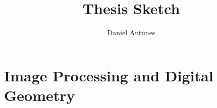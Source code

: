 \documentclass[12pt]{book}
\begin{document}
	\title{Thesis Sketch}
	\author{Daniel Antunes}
	\date{}
	\maketitle
	
	\newpage

		
	\newpage
	
	
	\tableofcontents	
	
	
	\part{Image Processing and Digital Geometry}
		
	
%	
%	
%	
%	
%		
%	
%	
	\begin{appendices}
%					
%		
%						
%				
%					
%				
	\end{appendices}
	
	


	
\end{document}
